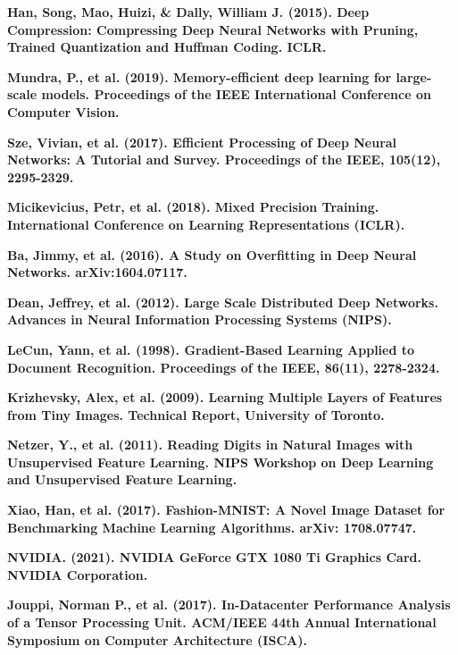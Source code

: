 \documentclass[sigconf]{acmart}
\begin{document}
\textbf{Han, Song, Mao, Huizi, \& Dally, William J. (2015). Deep Compression: Compressing Deep Neural Networks with Pruning, Trained Quantization and Huffman Coding. ICLR.}\vspace{3mm}

\textbf{Mundra, P., et al. (2019). Memory-efficient deep learning for large-scale models. Proceedings of the IEEE International Conference on Computer Vision.} \vspace{3mm}

\textbf{Sze, Vivian, et al. (2017). Efficient Processing of Deep Neural Networks: A Tutorial and Survey. Proceedings of the IEEE, 105(12), 2295-2329.} \vspace{3mm}

\textbf{Micikevicius, Petr, et al. (2018). Mixed Precision Training. International Conference on Learning Representations (ICLR).} \vspace{3mm}

\textbf{Ba, Jimmy, et al. (2016). A Study on Overfitting in Deep Neural Networks. arXiv:1604.07117.} \vspace{3mm}

\textbf{Dean, Jeffrey, et al. (2012). Large Scale Distributed Deep Networks. Advances in Neural Information Processing Systems (NIPS).} \vspace{3mm}

\textbf{LeCun, Yann, et al. (1998). Gradient-Based Learning Applied to Document Recognition. Proceedings of the IEEE, 86(11), 2278-2324.} \vspace{3mm}

\textbf{Krizhevsky, Alex, et al. (2009). Learning Multiple Layers of Features from Tiny Images. Technical Report, University of Toronto.} \vspace{3mm}

\textbf{Netzer, Y., et al. (2011). Reading Digits in Natural Images with Unsupervised Feature Learning. NIPS Workshop on Deep Learning and Unsupervised Feature Learning.} \vspace{3mm}

\textbf{Xiao, Han, et al. (2017). Fashion-MNIST: A Novel Image Dataset for Benchmarking Machine Learning Algorithms. arXiv:
1708.07747.} \vspace{3mm}

\textbf{NVIDIA. (2021). NVIDIA GeForce GTX 1080 Ti Graphics Card. NVIDIA Corporation.}\vspace{3mm}

\textbf{Jouppi, Norman P., et al. (2017). In-Datacenter Performance Analysis of a Tensor Processing Unit. ACM/IEEE 44th Annual International Symposium on Computer Architecture (ISCA).} \vspace{3mm}
\end{document}
